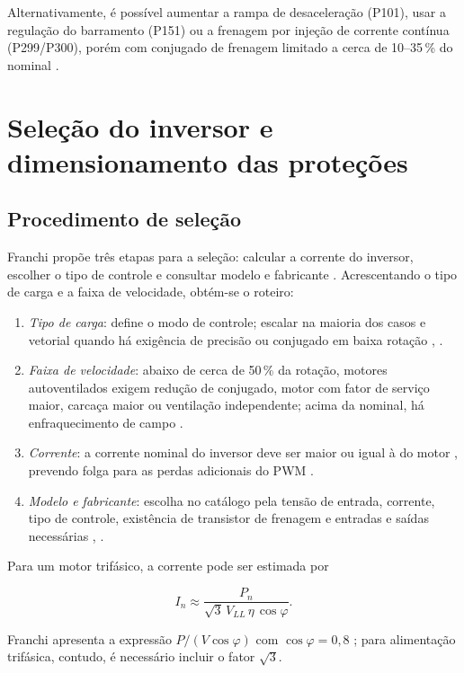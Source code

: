 \documentclass[conference]{IEEEtran}
\begin{document}
Alternativamente, é possível aumentar a rampa de desaceleração (P101), usar a regulação do barramento (P151) ou a frenagem por injeção de corrente contínua (P299/P300), porém com conjugado de frenagem limitado a cerca de 10--35\,\% do nominal \cite{b3}.

\section{Seleção do inversor e dimensionamento das proteções}

\subsection{Procedimento de seleção}

Franchi propõe três etapas para a seleção: calcular a corrente do inversor, escolher o tipo de controle e consultar modelo e fabricante \cite{b1}. Acrescentando o tipo de carga e a faixa de velocidade, obtém-se o roteiro:

\begin{enumerate}
    \item \textit{Tipo de carga}: define o modo de controle; escalar na maioria dos casos e vetorial quando há exigência de precisão ou conjugado em baixa rotação \cite{b1}, \cite{b8}.
    \item \textit{Faixa de velocidade}: abaixo de cerca de 50\,\% da rotação, motores autoventilados exigem redução de conjugado, motor com fator de serviço maior, carcaça maior ou ventilação independente; acima da nominal, há enfraquecimento de campo \cite{b1}.
    \item \textit{Corrente}: a corrente nominal do inversor deve ser maior ou igual à do motor \cite{b9}, prevendo folga para as perdas adicionais do PWM \cite{b1}.
    \item \textit{Modelo e fabricante}: escolha no catálogo pela tensão de entrada, corrente, tipo de controle, existência de transistor de frenagem e entradas e saídas necessárias \cite{b1}, \cite{b9}.
\end{enumerate}

Para um motor trifásico, a corrente pode ser estimada por

\begin{equation}
    I_{n}\approx\frac{P_n}{\sqrt{3}\,V_{LL}\,\eta\,\cos\varphi}.
\end{equation}

Franchi apresenta a expressão $P/(V\cos\varphi)$ com $\cos\varphi=0{,}8$ \cite{b1}; para alimentação trifásica, contudo, é necessário incluir o fator $\sqrt{3}$.
\end{document}
